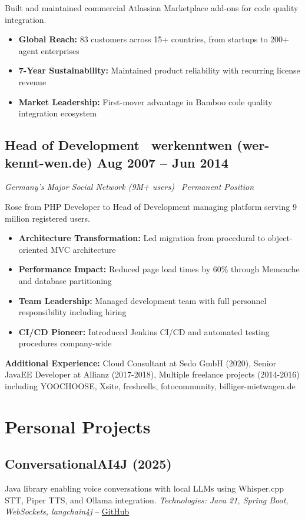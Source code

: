 \documentclass[10pt,a4paper]{article}
\begin{document}
Built and maintained commercial Atlassian Marketplace add-ons for code quality integration.
\begin{itemize}
\item \textbf{Global Reach:} 83 customers across 15+ countries, from startups to 200+ agent enterprises
\item \textbf{7-Year Sustainability:} Maintained product reliability with recurring license revenue
\item \textbf{Market Leadership:} First-mover advantage in Bamboo code quality integration ecosystem
\end{itemize}

\subsection{Head of Development \textbar\ werkenntwen (wer-kennt-wen.de) \hfill Aug 2007 -- Jun 2014}
\textit{Germany's Major Social Network (9M+ users) \textbar\ Permanent Position}

Rose from PHP Developer to Head of Development managing platform serving 9 million registered users.
\begin{itemize}
\item \textbf{Architecture Transformation:} Led migration from procedural to object-oriented MVC architecture
\item \textbf{Performance Impact:} Reduced page load times by 60\% through Memcache and database partitioning
\item \textbf{Team Leadership:} Managed development team with full personnel responsibility including hiring
\item \textbf{CI/CD Pioneer:} Introduced Jenkins CI/CD and automated testing procedures company-wide
\end{itemize}

\textbf{Additional Experience:} Cloud Consultant at Sedo GmbH (2020), Senior JavaEE Developer at Allianz (2017-2018), 
Multiple freelance projects (2014-2016) including YOOCHOOSE, Xsite, freshcells, fotocommunity, billiger-mietwagen.de

\section{Personal Projects}

\subsection{ConversationalAI4J (2025)}
Java library enabling voice conversations with local LLMs using Whisper.cpp STT, Piper TTS, and Ollama integration.
\textit{Technologies: Java 21, Spring Boot, WebSockets, langchain4j} -- \href{https://github.com/SchulteDev/ConversationalAI4J}{GitHub}
\end{document}
